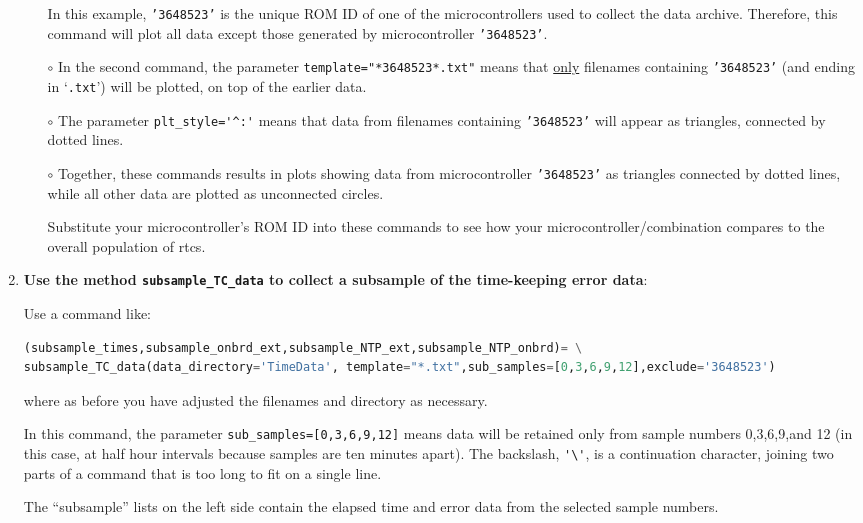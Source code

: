 \begin{enumerate}
\begin{itemize}
		\smallskip
		In this example, \texttt{'3648523'} is the unique ROM ID of one of the microcontrollers used to collect the data archive. 
		Therefore, this command will plot all data except those generated by microcontroller \texttt{'3648523'}.
		
		\item[$\circ$] In the second command, the parameter \lstinline{template="*3648523*.txt"} means that \underline{only} filenames containing \texttt{'3648523'} (and ending in `\texttt{.txt}') will be plotted, on top of the earlier data. 
		
		\item[$\circ$] The parameter \lstinline{plt_style='^:'} means that data from filenames containing \texttt{'3648523'} will appear as triangles, connected by dotted lines.
		
		\item[$\circ$] Together, these commands results in plots showing data from microcontroller \texttt{'3648523'} as triangles connected by dotted lines, while all other data are plotted as unconnected circles.
		
		\smallskip
		Substitute your microcontroller's ROM ID into these commands to see how your microcontroller/\rtc combination compares to the overall population of 
		rtcs.
	\end{itemize}
	
	\item \textbf{Use the \python method \lstinline{subsample_TC_data} to collect a subsample of the time-keeping error data}:
	
	Use a command like:
\begin{lstlisting}[language=Python]
(subsample_times,subsample_onbrd_ext,subsample_NTP_ext,subsample_NTP_onbrd)= \
subsample_TC_data(data_directory='TimeData', template="*.txt",sub_samples=[0,3,6,9,12],exclude='3648523')
\end{lstlisting}
	where as before you have adjusted the filenames and directory as necessary.

	In this command, the parameter \lstinline{sub_samples=[0,3,6,9,12]} means data will be retained only from sample numbers 0,3,6,9,and 12 (in this case, at half hour intervals because samples are ten minutes apart). The backslash, \lstinline{'\'}, is a continuation character, joining two parts of a command that is too long to fit on a single line.

	The ``subsample'' lists on the left side contain the elapsed time and error data from the selected sample numbers.
	

\end{enumerate}
